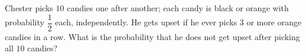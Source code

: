 Chester picks $10$ candies one after another; each candy is black or orange with probability $\dfrac{1}{2}$ each, independently. He gets upset if he ever picks $3$ or more orange candies in a row. What is the probability that he does not get upset after picking all $10$ candies?
